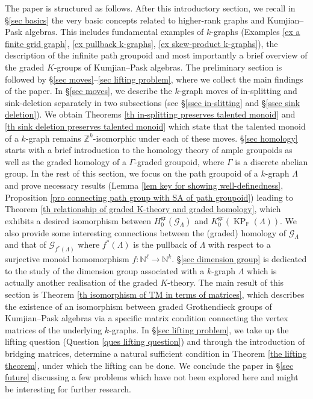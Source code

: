 \documentclass[12pt]{amsart}
\newcommand{\KP}{\operatorname{KP}}
\theoremstyle{definition}
\theoremstyle{remark}
\newcommand{\gr}{\operatorname{gr}}
\begin{document}
The paper is structured as follows. After this introductory section, we recall in \S \ref{sec basics} the very basic concepts related to higher-rank graphs and Kumjian--Pask algebras. This includes fundamental examples of $k$-graphs (Examples \ref{ex a finite grid graph}, \ref{ex pullback k-graphs}, \ref{ex skew-product k-graphs}), the description of the infinite path groupoid and most importantly a brief overview of the graded $K$-groups of Kumjian--Pask algebras. The preliminary section is followed by \S \ref{sec moves}--\ref{sec lifting problem}, where we collect the main findings of the paper. In \S \ref{sec moves}, we describe the $k$-graph moves of in-splitting and sink-deletion separately in two subsections (see \S \ref{ssec in-slitting} and \S \ref{ssec sink deletion}). We obtain Theorems \ref{th in-splitting preserves talented monoid} and \ref{th sink deletion preserves talented monoid} which state that the talented monoid of a $k$-graph remains $\mathbb{Z}^k$-isomorphic under each of these moves. \S \ref{sec homology} starts with a brief introduction to the homology theory of ample groupoids as well as the graded homology of a $\Gamma$-graded groupoid, where $\Gamma$ is a discrete abelian group. In the rest of this section, we focus on the path groupoid of a $k$-graph $\Lambda$ and prove necessary results (Lemma \ref{lem key for showing well-definedness}, Proposition \ref{pro connecting path group with SA of path groupoid}) leading to Theorem \ref{th relationship of graded K-theory and graded homology}, which exhibits a desired isomorphism between $H_0^{\gr}(\mathcal{G}_\Lambda)$ and $K_0^{\gr}(\KP_\mathsf{F}(\Lambda))$. We also provide some interesting connections between the (graded) homology of $\mathcal{G}_\Lambda$ and that of $\mathcal{G}_{f^*(\Lambda)}$ where $f^*(\Lambda)$ is the pullback of $\Lambda$ with respect to a surjective monoid homomorphism $f:\mathbb{N}^\ell\longrightarrow \mathbb{N}^k$. \S \ref{sec dimension group} is dedicated to the study of the dimension group associated with a $k$-graph $\Lambda$ which is actually another realisation of the graded $K$-theory. The main result of this section is Theorem \ref{th isomorphism of TM in terms of matrices}, which describes the existence of an isomorphism between graded Grothendieck groups of Kumjian--Pask algebras via a specific matrix condition connecting the vertex matrices of the underlying $k$-graphs. In \S \ref{sec lifting problem}, we take up the lifting question (Question \ref{ques lifting question}) and through the introduction of bridging matrices, determine a natural sufficient condition in Theorem \ref{the lifting theorem}, under which the lifting can be done. We conclude the paper in \S \ref{sec future} discussing a few problems which have not been explored here and might be interesting for further research. 
\end{document}
